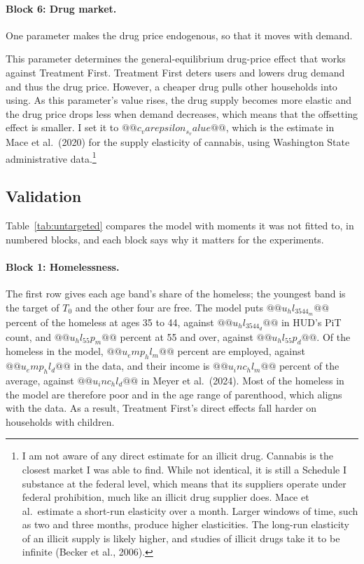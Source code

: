 \documentclass[10pt]{article}
\begin{document}
\paragraph{Block 6: Drug market.} One parameter makes the drug price endogenous, so that it moves with demand.
\begin{description}\setlength{\itemsep}{0.25em}\setlength{\parskip}{0em}
\item[$\varepsilon_s$, the price elasticity of drug supply.]   This parameter determines the general-equilibrium drug-price effect that works against Treatment First. Treatment First deters users and lowers drug demand and thus the drug price. However, a cheaper drug pulls other households into using. As this parameter's value rises, the drug supply becomes more elastic and the drug price drops less when demand decreases, which means that the offsetting effect is smaller. I set it to $@@c_varepsilon_s_value@@$, which is the estimate in Mace et al.\ (2020) for the supply elasticity of cannabis, using Washington State administrative data.\footnote{  I am not aware of any direct estimate for an illicit drug. Cannabis is the closest market I was able to find. While not identical, it is still a Schedule I substance at the federal level, which means that its suppliers operate under federal prohibition, much like an illicit drug supplier does. Mace et al.\ estimate a short-run elasticity over a month. Larger windows of time, such as two and three months, produce higher elasticities. The long-run elasticity of an illicit supply is likely higher, and studies of illicit drugs take it to be infinite (Becker et al., 2006).}
\end{description}

\subsection{Validation}\label{sec:fvalid}

Table~\ref{tab:untargeted} compares the model with moments it was not fitted to, in numbered blocks, and each block says why it matters for the experiments.

\paragraph{Block 1: Homelessness.} The first row gives each age band's share of the homeless; the youngest band is the target of $T_0$ and the other four are free. The model puts $@@u_hl_3544_m@@$ percent of the homeless at ages 35 to 44, against $@@u_hl_3544_d@@$ in HUD's PiT count, and $@@u_hl_55p_m@@$ percent at 55 and over, against $@@u_hl_55p_d@@$. Of the homeless in the model, $@@u_emp_hl_m@@$ percent are employed, against $@@u_emp_hl_d@@$ in the data, and their income is $@@u_inc_hl_m@@$ percent of the average, against $@@u_inc_hl_d@@$ in Meyer et al.\ (2024).   Most of the homeless in the model are therefore poor and in the age range of parenthood, which aligns with the data.  As a result, Treatment First's direct effects fall harder on households with children.
\end{document}
